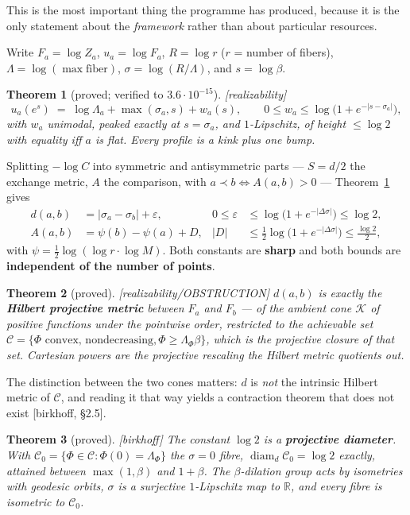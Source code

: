 \documentclass[11pt]{article}
\theoremstyle{plain}
\newtheorem{theorem}{Theorem}[section]
\theoremstyle{remark}
\newcommand{\R}{\mathbb R}
\newcommand{\Cone}{\mathcal C}
\newcommand{\Kone}{\mathcal K}
\newcommand{\source}[1]{{\normalfont\small\textsf{[#1]}}}
\begin{document}
This is the most important thing the programme has produced, because it is the
only statement about the \emph{framework} rather than about particular
resources.

Write $F_a = \log Z_a$, $u_a = \log F_a$, $R = \log r$ ($r$ = number of fibers),
$\Lambda = \log(\max \text{fiber})$, $\sigma = \log(R/\Lambda)$, and
$s = \log\beta$.

\begin{theorem}[proved; verified to $3.6\cdot10^{-15}$]\label{thm:A}
\source{realizability}
\[
  u_a(e^s) \;=\; \log\Lambda_a + \max(\sigma_a, s) + w_a(s),
  \qquad 0 \le w_a \le \log\!\bigl(1 + e^{-|s-\sigma_a|}\bigr),
\]
with $w_a$ unimodal, peaked exactly at $s = \sigma_a$, and $1$-Lipschitz, of
height $\le \log 2$ with equality iff $a$ is flat.  Every profile is a kink plus
one bump.
\end{theorem}

Splitting $-\log C$ into symmetric and antisymmetric parts --- $S = d/2$ the
exchange metric, $A$ the comparison, with $a \prec b \iff A(a,b) > 0$ ---
Theorem~\ref{thm:A} gives
\begin{align}
  d(a,b) &= |\sigma_a - \sigma_b| + \varepsilon,
  & 0 \le \varepsilon &\le \log\bigl(1+e^{-|\Delta\sigma|}\bigr) \le \log 2,
  \label{eq:metric}\\
  A(a,b) &= \psi(b) - \psi(a) + D,
  & |D| &\le \tfrac12\log\bigl(1+e^{-|\Delta\sigma|}\bigr) \le \tfrac{\log 2}{2},
  \label{eq:comparison}
\end{align}
with $\psi = \frac12\log(\log r \cdot \log M)$.  Both constants are
\textbf{sharp} and both bounds are \textbf{independent of the number of points}.

\begin{theorem}[proved]\label{thm:B}
\source{realizability/OBSTRUCTION}
$d(a,b)$ is exactly the \textbf{Hilbert projective metric} between $F_a$ and
$F_b$ --- of the ambient cone $\Kone$ of positive functions under the pointwise
order, restricted to the achievable set
$\Cone = \{\Phi \text{ convex, nondecreasing}, \Phi \ge \Lambda_\Phi\beta\}$,
which is the projective closure of that set.  Cartesian powers are the
projective rescaling the Hilbert metric quotients out.
\end{theorem}

The distinction between the two cones matters: $d$ is \emph{not} the intrinsic
Hilbert metric of $\Cone$, and reading it that way yields a contraction theorem
that does not exist \source{birkhoff, \S2.5}.

\begin{theorem}[proved]\label{thm:Bprime}
\source{birkhoff}
The constant $\log 2$ is a \textbf{projective diameter}.  With
$\Cone_0 = \{\Phi \in \Cone : \Phi(0) = \Lambda_\Phi\}$ the $\sigma = 0$ fibre,
$\operatorname{diam}_d \Cone_0 = \log 2$ exactly, attained between $\max(1,\beta)$
and $1+\beta$.  The $\beta$-dilation group acts by isometries with geodesic
orbits, $\sigma$ is a surjective $1$-Lipschitz map to $\R$, and every fibre is
isometric to $\Cone_0$.
\end{theorem}
\end{document}
